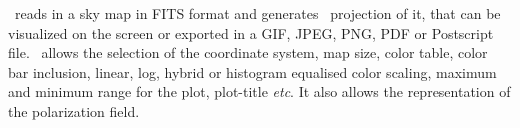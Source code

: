 
{\thedocid \ reads in a \healpix sky map in FITS format and generates
\projfullname \ projection of it, that can be visualized on the screen or
exported in a GIF, JPEG, PNG, PDF or Postscript file. \thedocid \  allows the selection of
the coordinate system, map size, color table, color bar inclusion,
linear, log, hybrid or histogram equalised color scaling, 
maximum and 
minimum range for the plot, plot-title {\it etc}. It also allows the representation of the
polarization field.}

